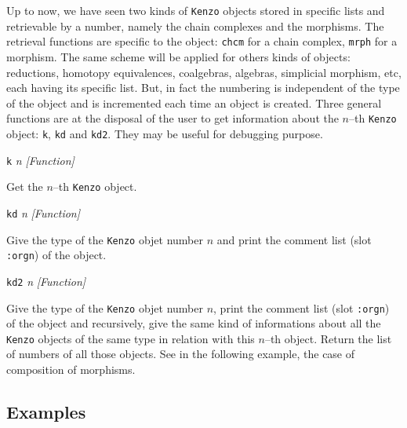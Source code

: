 Up to now, we have seen two kinds of {\tt Kenzo} objects stored in specific lists
and retrievable by a number, namely the chain complexes and the morphisms. The retrieval functions
are specific to the object: {\tt chcm} for a chain complex, {\tt mrph} for a morphism.
The same scheme will be applied for others kinds of objects: reductions, homotopy equivalences,
coalgebras, algebras, simplicial morphism, etc, each having its specific list.
But, in fact the numbering is independent
of the type of the object and is incremented each time an object is created. Three general
functions are at the disposal of the user to get information about
the $n$--th {\tt Kenzo} object: {\tt k}, {\tt kd}
and {\tt kd2}. They may be useful for debugging purpose.
\vskip 0.35cm
{\parindent=0mm
{\leftskip=5mm
{\tt k} {\em n} \hfill {\em [Function]} \par}
{\leftskip=15mm
Get the $n$--th {\tt Kenzo} object. \par}
{\leftskip=5mm
{\tt kd} {\em n} \hfill {\em [Function]} \par}
{\leftskip=15mm
Give the type of the {\tt Kenzo} objet number $n$ and print the comment
list (slot {\tt :orgn}) of the object. \par}
{\leftskip=5mm
{\tt kd2} {\em n} \hfill {\em [Function]} \par}
{\leftskip=15mm
Give the type of the {\tt Kenzo} objet number $n$, print the comment
list (slot {\tt :orgn}) of the object and recursively, give the same kind of informations
about all the {\tt Kenzo} objects of the same type in relation with this $n$--th object.
Return the list of numbers of all those objects.
See in the following example, the case of composition of morphisms. \par}
}

\subsection* {Examples}

